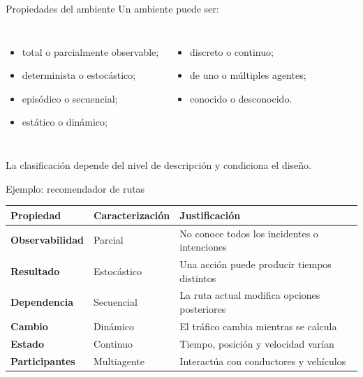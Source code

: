 \documentclass[aspectratio=169,11pt]{beamer}
\begin{document}
\begin{frame}{Propiedades del ambiente}
  Un ambiente puede ser:
  \begin{columns}[T]
      \begin{itemize}
        \item total o parcialmente observable;
        \item determinista o estocástico;
        \item episódico o secuencial;
        \item estático o dinámico;
      \end{itemize}
      \begin{itemize}
        \item discreto o continuo;
        \item de uno o múltiples agentes;
        \item conocido o desconocido.
      \end{itemize}
  \end{columns}
  \vfill
  \centering\alert{La clasificación depende del nivel de descripción y condiciona el diseño.}
\end{frame}

\begin{frame}{Ejemplo: recomendador de rutas}
  \scriptsize
  \begin{tabularx}{\textwidth}{>{\bfseries}p{} p{} X}
    \toprule
    Propiedad & Caracterización & Justificación \\
    \midrule
    Observabilidad & Parcial & No conoce todos los incidentes o intenciones \\
    Resultado & Estocástico & Una acción puede producir tiempos distintos \\
    Dependencia & Secuencial & La ruta actual modifica opciones posteriores \\
    Cambio & Dinámico & El tráfico cambia mientras se calcula \\
    Estado & Continuo & Tiempo, posición y velocidad varían \\
    Participantes & Multiagente & Interactúa con conductores y vehículos \\
    \bottomrule
  \end{tabularx}
\end{frame}
\end{document}
